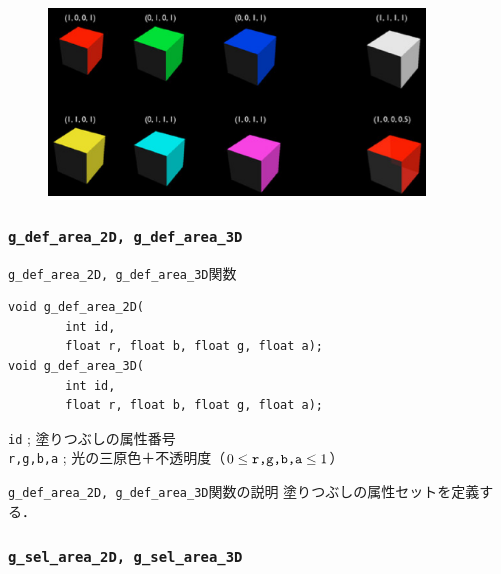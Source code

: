 \documentclass[platex,a4paper,12pt]{jsarticle}%
\begin{document}
\begin{figure}[htb]
\centering
\includegraphics[width=100mm]{Canvas_g_area_color.eps}
\end{figure}

\clearpage
\subsubsection{\texttt{g\_def\_area\_2D, g\_def\_area\_3D}}

\begin{itembox}[l]{\texttt{g\_def\_area\_2D, g\_def\_area\_3D}関数}
\begin{verbatim}
void g_def_area_2D(
        int id,	
        float r, float b, float g, float a);
void g_def_area_3D(
        int id,	
        float r, float b, float g, float a);
\end{verbatim}
\verb|id| ; 塗りつぶしの属性番号\\
\verb|r,g,b,a| ; 光の三原色＋不透明度（$0\leq \verb|r,g,b,a| \leq 1$）
\end{itembox}

\begin{itembox}[l]{\texttt{g\_def\_area\_2D, g\_def\_area\_3D}関数の説明}
塗りつぶしの属性セットを定義する．
\end{itembox}

\subsubsection{\texttt{g\_sel\_area\_2D, g\_sel\_area\_3D}}
\end{document}
